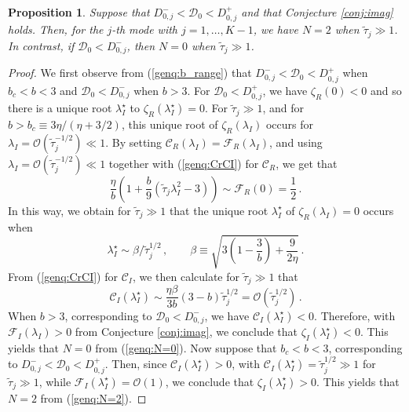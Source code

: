 \documentclass{article}%
\newtheorem{prop}[theorem]{Proposition}
\newcommand{\dzjp}{D^{+}_{0,j}}
\newcommand{\dzjm}{D^{-}_{0,j}}
\begin{document}
\begin{prop}\label{prop:genq:hopf} Suppose that $\dzjm<{\mathcal D}_0<\dzjp$
and that Conjecture \ref{conj:imag} holds. Then, for the $j$-th mode
with $j=1,\ldots,K-1$, we have $N=2$ when $\tilde{\tau}_j \gg 1$.  In
contrast, if ${\mathcal D}_0<\dzjm$, then $N=0$ when $\tilde{\tau}_j
\gg 1$.
\end{prop}

\begin{proof}
We first observe from (\ref{genq:b_range}) that $\dzjm<{\mathcal
  D}_0<\dzjp$ when $b_c<b<3$ and ${\mathcal D}_0<\dzjm$ when
$b>3$. For ${\mathcal D}_0<\dzjp$, we have $\zeta_R(0)<0$ and so there
is a unique root $\lambda_I^{\star}$ to
$\zeta_R(\lambda_I^{\star})=0$. For $\tilde{\tau}_j\gg 1$, and for
$b>b_c\equiv {3\eta/(\eta+{3/2})}$, this unique root of
$\zeta_R(\lambda_I)$ occurs for $\lambda_I={\mathcal
  O}(\tilde{\tau}_j^{-1/2})\ll 1$. By setting ${\mathcal
  C}_R(\lambda_I)={\mathcal F}_{R}(\lambda_I)$, and using
$\lambda_I={\mathcal O}(\tilde{\tau}_j^{-1/2})\ll 1$ together with
(\ref{genq:CrCI}) for ${\mathcal C}_R$, we get that
\begin{equation*}
  \frac{\eta}{b} \left( 1 + \frac{b}{9} (\tilde{\tau}_j \lambda_I^2-3)
  \right) \sim {\mathcal F}_R(0)=\frac{1}{2} \,.
\end{equation*}
In this way, we obtain for $\tilde{\tau}_j\gg 1$ that the unique root
$\lambda_{I}^{\star}$ of $\zeta_R(\lambda_I)=0$ occurs when
\begin{equation}
   \lambda_{I}^{\star} \sim {\beta/\tilde{\tau}_j^{1/2}} \,, \qquad 
 \beta \equiv \sqrt{3 \left(1- \frac{3}{b}\right) + \frac{9}{2\eta}}\,.
\end{equation}
From (\ref{genq:CrCI}) for ${\mathcal C}_I$, we then calculate for
$\tilde{\tau}_j\gg 1$ that
\begin{equation}\label{shit:eq}
   {\mathcal C}_I(\lambda_I^{\star}) \sim \frac{\eta\beta}{3b}(3-b) 
  \tilde{\tau}_j^{1/2} = {\mathcal O}(\tilde{\tau}_j^{1/2}) \,.
\end{equation}
When $b>3$, corresponding to ${\mathcal D}_0<\dzjm$, we have ${\mathcal
  C}_I(\lambda_I^{\star})<0$. Therefore, with ${\mathcal
  F}_I(\lambda_I)>0$ from Conjecture \ref{conj:imag}, we conclude that
$\zeta_I(\lambda_{I}^{\star})<0$. This yields that $N=0$ from
(\ref{genq:N=0}). Now suppose that $b_c<b<3$, corresponding to
$\dzjm<{\mathcal D}_0<\dzjp$.  Then, since ${\mathcal
  C}_I(\lambda_I^{\star})>0$, with ${\mathcal
  C}_I(\lambda_I^{\star})=\tilde{\tau}_j^{1/2}\gg 1$ for
$\tilde{\tau}_j\gg 1$, while ${\mathcal
  F}_I(\lambda_I^{\star})={\mathcal O}(1)$, we conclude that
$\zeta_I(\lambda_I^{\star})>0$. This yields that $N=2$ from 
(\ref{genq:N=2}).
\end{proof}
\end{document}
